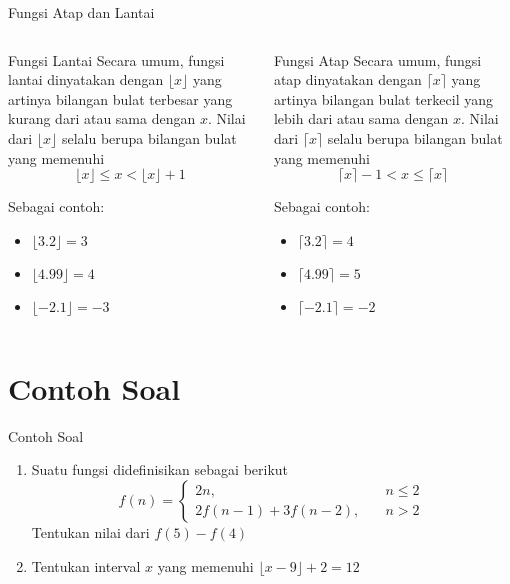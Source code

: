 \documentclass[10pt,aspectratio=54, handout]{beamer}
\newcommand{\floor}[1]{\lfloor #1 \rfloor}
\newcommand{\ceil}[1]{\lceil #1 \rceil}
\begin{document}
  \begin{frame}{Fungsi Atap dan Lantai}
  
  \begin{columns}[c]
    \begin{block}{Fungsi Lantai}
      Secara umum, fungsi lantai dinyatakan dengan $\floor{x}$ yang artinya bilangan bulat terbesar yang kurang dari atau sama dengan $x$. Nilai dari $\floor{x}$ selalu berupa bilangan bulat yang memenuhi
      $$\floor{x}\leq x < \floor{x}+ 1$$
      
      Sebagai contoh:
      \begin{itemize}
        \item $\floor{3.2} = 3$
        \item $\floor{4.99} = 4$
        \item $\floor{-2.1} = -3$
      \end{itemize}
    \end{block}
    
    \begin{block}{Fungsi Atap}
      Secara umum, fungsi atap dinyatakan dengan $\ceil{x}$ yang artinya bilangan bulat terkecil yang lebih dari atau sama dengan $x$. Nilai dari $\ceil{x}$ selalu berupa bilangan bulat yang memenuhi
      $$\ceil{x}-1< x \leq \ceil{x}$$
      
      Sebagai contoh:
      \begin{itemize}
        \item $\ceil{3.2} = 4$
        \item $\ceil{4.99} = 5$
        \item $\ceil{-2.1} = -2$
      \end{itemize}
    \end{block}
    
    
    \end{columns}
  \end{frame}
  
  \section{Contoh Soal}
  \label{sec:Contoh Soal}
  
  \begin{frame}{Contoh Soal}
    \begin{enumerate}
      \item Suatu fungsi didefinisikan sebagai berikut
      $$f(n) =
      \begin{cases}
      2n, &\quad n \leq 2 \\
       2f(n-1) + 3f(n-2), & \quad n > 2
      \end{cases}
      $$
      Tentukan nilai dari $f(5)-f(4)$
      \item Tentukan interval $x$ yang memenuhi $\floor{x-9}+2 = 12$
    \end{enumerate}
  \end{frame}
  
\end{document}
